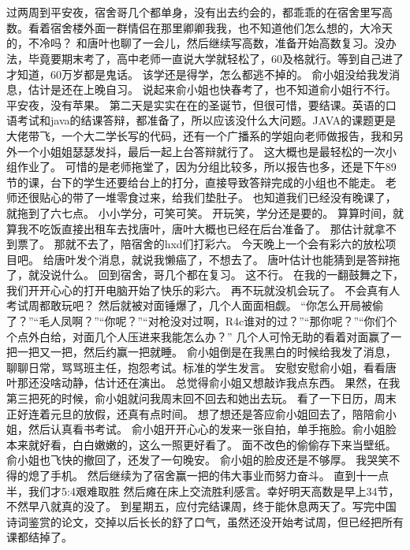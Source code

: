\chapter{}
过两周到平安夜，宿舍哥几个都单身，没有出去约会的，都乖乖的在宿舍里写高数。看着宿舍楼外面一群情侣在那里卿卿我我，也不知道他们怎么想的，大冷天的，不冷吗？
和唐叶也聊了一会儿，然后继续写高数，准备开始高数复习。没办法，毕竟要期末考了，高中老师一直说大学就轻松了，60及格就行。等到自己进了才知道，60万岁都是鬼话。
该学还是得学，怎么都逃不掉的。
俞小姐没给我发消息，估计是还在上晚自习。
说起来俞小姐也快春考了，也不知道俞小姐行不行。
平安夜，没有苹果。
第二天是实实在在的圣诞节，但很可惜，要结课。英语的口语考试和java的结课答辩，都准备了，所以应该没什么大问题。JAVA的课题更是大佬带飞，一个大二学长写的代码，还有一个广播系的学姐向老师做报告，我和另外一个小姐姐瑟瑟发抖，最后一起上台答辩就行了。
这大概也是最轻松的一次小组作业了。
可惜的是老师拖堂了，因为分组比较多，所以报告也多，还是下午89节的课，台下的学生还要给台上的打分，直接导致答辩完成的小组也不能走。
老师还很贴心的带了一堆零食过来，给我们垫肚子。
也知道我们已经没有晚课了，就拖到了六七点。
小小学分，可笑可笑。
开玩笑，学分还是要的。
算算时间，就算我不吃饭直接出租车去找唐叶，唐叶大概也已经在后台准备了。
那估计就拿不到票了。
那就不去了，陪宿舍的hxd们打彩六。
今天晚上一个会有彩六的放松项目吧。
给唐叶发个消息，就说我懒癌了，不想去了。
唐叶估计也能猜到是答辩拖了，就没说什么。
回到宿舍，哥几个都在复习。
这不行。
在我的一翻鼓舞之下，我们开开心心的打开电脑开始了快乐的彩六。
再不玩就没机会玩了。
不会真有人考试周都敢玩吧？
然后就被对面锤爆了，几个人面面相觑。
“你怎么开局被偷了？”“毛人凤啊？”“你呢？”“对枪没对过啊，R4c谁对的过？”“那你呢？”“你们个个点外白给，对面几个人压进来我能怎么办？”
几个人可怜无助的看着对面赢了一把一把又一把，然后约赢一把就睡。
俞小姐倒是在我黑白的时候给我发了消息，聊聊日常，骂骂班主任，抱怨考试。标准的学生发言。
安慰安慰俞小姐，看看唐叶那还没啥动静，估计还在演出。
总觉得俞小姐又想敲诈我点东西。
果然，在我第三把死的时候，俞小姐就问我周末回不回去和她出去玩。
看了一下日历，周末正好连着元旦的放假，还真有点时间。
想了想还是答应俞小姐回去了，陪陪俞小姐，然后认真看书考试。
俞小姐开开心心的发来一张自拍，单手拖脸。俞小姐脸本来就好看，白白嫩嫩的，这么一照更好看了。
面不改色的偷偷存下来当壁纸。
俞小姐也飞快的撤回了，还发了一句晚安。
俞小姐的脸皮还是不够厚。
我哭笑不得的熄了手机。
然后继续为了宿舍赢一把的伟大事业而努力奋斗。
直到十一点半，我们才5:4艰难取胜 然后瘫在床上交流胜利感言。幸好明天高数是早上34节，不然早八就真的没了。
到星期五，应付完结课周，终于能休息两天了。写完中国诗词鉴赏的论文，交掉以后长长的舒了口气，虽然还没开始考试周，但已经把所有课都结掉了。
